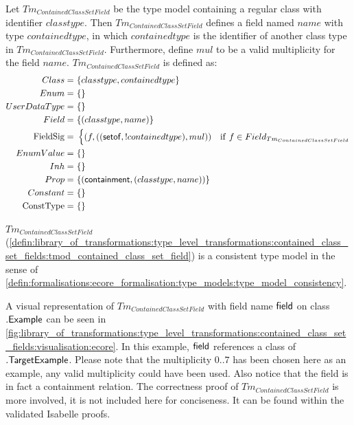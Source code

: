 \begin{defin}
\label{defin:library_of_transformations:type_level_transformations:contained_class_set_fields:tmod_contained_class_set_field}
Let $Tm_{ContainedClassSetField}$ be the type model containing a regular class with identifier $classtype$. Then $Tm_{ContainedClassSetField}$ defines a field named $name$ with type $containedtype$, in which $containedtype$ is the identifier of another class type in $Tm_{ContainedClassSetField}$. Furthermore, define $mul$ to be a valid multiplicity for the field $name$. $Tm_{ContainedClassSetField}$ is defined as:
\begin{align*}
Class =\ &\{classtype, containedtype\} \\
Enum =\ &\{\} \\
UserDataType =\ &\{\} \\
Field =\ &\{(classtype, name)\} \\
\mathrm{FieldSig} =\ &\begin{cases}
    (f, ((\mathsf{setof}, !containedtype), mul)) &\mathrm{if}\ f \in Field_{Tm_{ContainedClassSetField}}
\end{cases} \\
EnumValue =\ &\{\} \\
Inh =\ &\{\} \\
Prop =\ &\{(\mathsf{containment}, (classtype, name))\} \\
Constant =\ &\{\} \\
\mathrm{ConstType} =\ &\{\}
\end{align*}
\end{defin}

\begin{thm}
\label{defin:library_of_transformations:type_level_transformations:contained_class_set_fields:tmod_contained_class_set_field_correct}
$Tm_{ContainedClassSetField}$ (\cref{defin:library_of_transformations:type_level_transformations:contained_class_set_fields:tmod_contained_class_set_field}) is a consistent type model in the sense of \cref{defin:formalisations:ecore_formalisation:type_models:type_model_consistency}.
\end{thm}

A visual representation of $Tm_{ContainedClassSetField}$ with field name $\mathsf{field}$ on class $.\mathsf{Example}$ can be seen in \cref{fig:library_of_transformations:type_level_transformations:contained_class_set_fields:visualisation:ecore}. In this example, $\mathsf{field}$ references a class of $.\mathsf{TargetExample}$. Please note that the multiplicity $0..7$ has been chosen here as an example, any valid multiplicity could have been used. Also notice that the field is in fact a containment relation. The correctness proof of $Tm_{ContainedClassSetField}$ is more involved, it is not included here for conciseness. It can be found within the validated Isabelle proofs.

